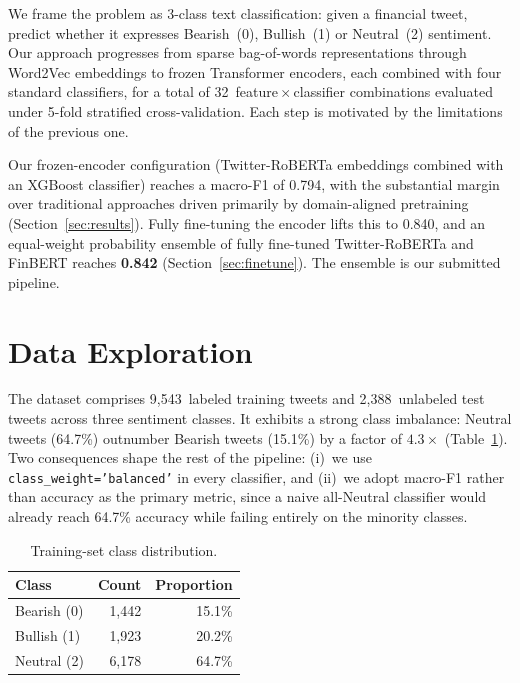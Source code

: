 \documentclass[12pt,a4paper]{article}
\begin{document}
We frame the problem as 3-class text classification: given a financial tweet, predict whether it expresses Bearish~(0), Bullish~(1) or Neutral~(2) sentiment. Our approach progresses from sparse bag-of-words representations through Word2Vec embeddings to frozen Transformer encoders, each combined with four standard classifiers, for a total of 32~feature\,$\times$\,classifier combinations evaluated under 5-fold stratified cross-validation. Each step is motivated by the limitations of the previous one.

Our frozen-encoder configuration (Twitter-RoBERTa embeddings combined with an XGBoost classifier) reaches a macro-F1 of 0.794, with the substantial margin over traditional approaches driven primarily by domain-aligned pretraining (Section~\ref{sec:results}). Fully fine-tuning the encoder lifts this to 0.840, and an equal-weight probability ensemble of fully fine-tuned Twitter-RoBERTa and FinBERT reaches \textbf{0.842} (Section~\ref{sec:finetune}). The ensemble is our submitted pipeline.

\section{Data Exploration}
\label{sec:data}

The dataset comprises 9,543~labeled training tweets and 2,388~unlabeled test tweets across three sentiment classes. It exhibits a strong class imbalance: Neutral tweets (64.7\%) outnumber Bearish tweets (15.1\%) by a factor of $4.3\times$ (Table~\ref{tab:class_dist}). Two consequences shape the rest of the pipeline: (i)~we use \texttt{class\_weight='balanced'} in every classifier, and (ii)~we adopt macro-F1 rather than accuracy as the primary metric, since a naive all-Neutral classifier would already reach 64.7\% accuracy while failing entirely on the minority classes.

\begin{table}[!htbp]
\centering
\begin{tabular}{lrr}
\toprule
\textbf{Class} & \textbf{Count} & \textbf{Proportion} \\
\midrule
Bearish (0) & 1,442 & 15.1\% \\
Bullish (1) & 1,923 & 20.2\% \\
Neutral (2) & 6,178 & 64.7\% \\
\bottomrule
\end{tabular}
\caption{Training-set class distribution.}
\label{tab:class_dist}
\end{table}
\end{document}
